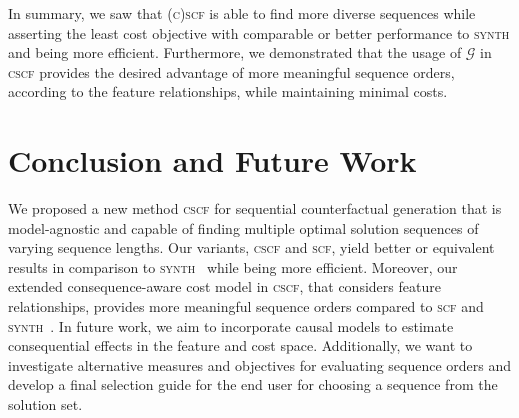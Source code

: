 \documentclass[runningheads, envcountsame, a4paper]{llncs}
\newcommand{\ours}{\textsc{cscf}}
\newcommand{\oursShort}{\ours}
\newcommand{\oursBoth}{\textsc{(c)scf}}
\newcommand{\mainEA}{\oursShort}
\newcommand{\competitor}{\textsc{synth}}
\newcommand{\alternativeEA}{\textsc{scf}}
\newcommand{\dependencyGraph}{\mathcal{G}}
\begin{document}
In summary, we saw that \oursBoth{} is able to find more diverse sequences while asserting the least cost objective with comparable or better performance to \competitor{} and being more efficient. Furthermore, we demonstrated that the usage of $\dependencyGraph$ in \mainEA{} provides the desired advantage of more meaningful sequence orders, according to the feature relationships, while maintaining minimal costs.



\section{Conclusion and Future Work}
\label{sec:conclusion}
We proposed a new method \mainEA{} for sequential counterfactual generation that is  model-agnostic and capable of finding multiple optimal solution sequences of varying sequence lengths.
Our variants, \mainEA{} and \alternativeEA{}, yield better or equivalent results in comparison to \competitor{}~\cite{ramakrishnanSynthesizingActionSequences2020} while being more efficient.
Moreover, our extended consequence-aware cost model in \mainEA{}, that considers feature relationships, provides more meaningful sequence orders compared to \alternativeEA{} and \competitor{}~\cite{ramakrishnanSynthesizingActionSequences2020}.
In future work, we aim to incorporate causal models to estimate consequential effects in the feature and cost space. Additionally, we want to investigate alternative measures and objectives for evaluating sequence orders and develop a final selection guide for the end user for choosing a sequence from the solution set.
%
%

% 
\end{document}
